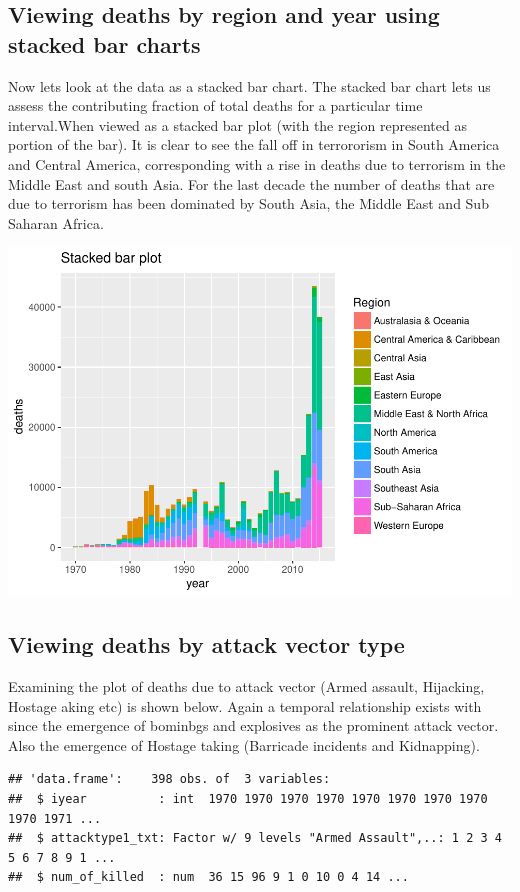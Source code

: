 \documentclass[]{article}
\begin{document}
\subsection{Viewing deaths by region and year using stacked bar
charts}\label{viewing-deaths-by-region-and-year-using-stacked-bar-charts}

Now lets look at the data as a stacked bar chart. The stacked bar chart
lets us assess the contributing fraction of total deaths for a
particular time interval.When viewed as a stacked bar plot (with the
region represented as portion of the bar). It is clear to see the fall
off in terrororism in South America and Central America, corresponding
with a rise in deaths due to terrorism in the Middle East and south
Asia. For the last decade the number of deaths that are due to terrorism
has been dominated by South Asia, the Middle East and Sub Saharan
Africa.

\includegraphics{Peters_experiment_markdown_files/figure-latex/unnamed-chunk-6-1.pdf}

\subsection{Viewing deaths by attack vector
type}\label{viewing-deaths-by-attack-vector-type}

Examining the plot of deaths due to attack vector (Armed assault,
Hijacking, Hostage aking etc) is shown below. Again a temporal
relationship exists with since the emergence of bominbgs and explosives
as the prominent attack vector. Also the emergence of Hostage taking
(Barricade incidents and Kidnapping).

\begin{verbatim}
## 'data.frame':    398 obs. of  3 variables:
##  $ iyear          : int  1970 1970 1970 1970 1970 1970 1970 1970 1970 1971 ...
##  $ attacktype1_txt: Factor w/ 9 levels "Armed Assault",..: 1 2 3 4 5 6 7 8 9 1 ...
##  $ num_of_killed  : num  36 15 96 9 1 0 10 0 4 14 ...
\end{verbatim}
\end{document}
